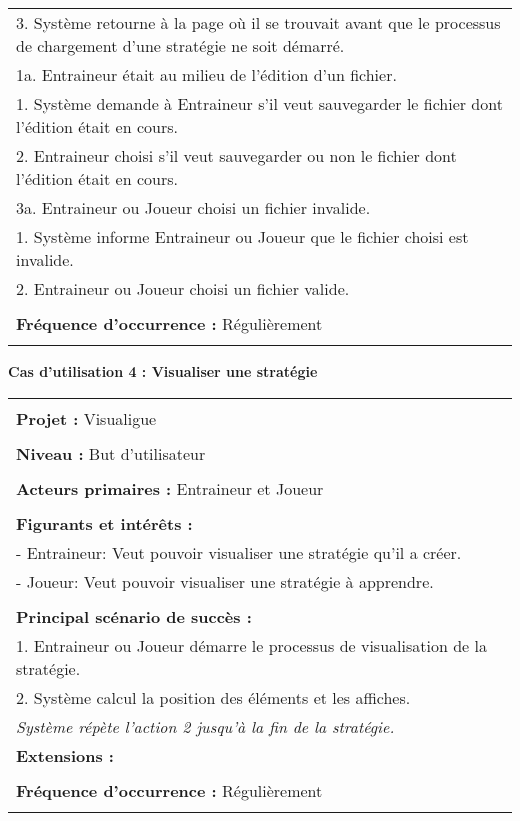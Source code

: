 \begin{tabular}{|p{16cm}|}
	\hspace{1cm}3. Système retourne à la page où il se trouvait avant que le processus de chargement d'une stratégie ne soit démarré.\\
	1a. Entraineur était au milieu de l'édition d'un fichier.\\
	\hspace{1cm}1. Système demande à Entraineur s'il veut sauvegarder le fichier dont l'édition était en cours.\\
	\hspace{1cm}2. Entraineur choisi s'il veut sauvegarder ou non le fichier dont l'édition était en cours.\\
	3a. Entraineur ou Joueur choisi un fichier invalide.\\
	\hspace{1cm}1. Système informe Entraineur ou Joueur que le fichier choisi est invalide.\\
	\hspace{1cm}2. Entraineur ou Joueur choisi un fichier valide.\\
	\\
	\textbf{Fréquence d'occurrence :} Régulièrement\\
	\\
	\hline
\end{tabular}

\newpage
\begin{flushleft}
	\textbf{Cas d'utilisation 4 : Visualiser une stratégie}\\
\end{flushleft}
\begin{tabular}{|p{16cm}|}
	\hline
	\\
	\textbf{Projet :} Visualigue\\
	\\
	\textbf{Niveau :} But d'utilisateur\\
	\\
	\textbf{Acteurs primaires :} Entraineur et Joueur\\
	\\
	\textbf{Figurants et intérêts :} \\
	- Entraineur: Veut pouvoir visualiser une stratégie qu'il a créer.\\
	- Joueur: Veut pouvoir visualiser une stratégie à apprendre.\\
	\\
	\textbf{Principal scénario de succès :}\\
	1. Entraineur ou Joueur démarre le processus de visualisation de la stratégie.\\
	2. Système calcul la position des éléments et les affiches.\\
	\hspace{1cm} \em Système répète l'action 2 jusqu'à la fin de la stratégie.
	\\
	\textbf{Extensions :}\\
	\\
	\textbf{Fréquence d'occurrence :} Régulièrement\\
	\\
	\hline
\end{tabular}


